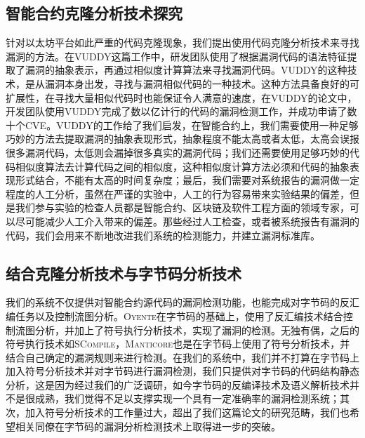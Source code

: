 \subsection{智能合约克隆分析技术探究}
针对以太坊平台如此严重的代码克隆现象，我们提出使用代码克隆分析技术来寻找漏洞的方法。在VUDDY\cite{vuddy}这篇工作中，研发团队使用了根据漏洞代码的语法特征提取了漏洞的抽象表示，再通过相似度计算算法来寻找漏洞代码。VUDDY的这种技术，是从漏洞本身出发，寻找与漏洞相似代码的一种技术。这种方法具备良好的可扩展性，在寻找大量相似代码时也能保证令人满意的速度，在VUDDY的论文中，开发团队使用VUDDY完成了数以亿计行的代码的漏洞检测工作，并成功申请了数十个CVE。VUDDY的工作给了我们启发，在智能合约上，我们需要使用一种足够巧妙的方法去提取漏洞的抽象表现形式，抽象程度不能太高或者太低，太高会误报很多漏洞代码，太低则会漏掉很多真实的漏洞代码；我们还需要使用足够巧妙的代码相似度算法去计算代码之间的相似度，这种相似度计算方法必须和代码的抽象表现形式结合，不能有太高的时间复杂度；最后，我们需要对系统报告的漏洞做一定程度的人工分析，虽然在严谨的实验中，人工的行为容易带来实验结果的偏差，但是我们参与实验的检查人员都是智能合约、区块链及软件工程方面的领域专家，可以尽可能减少人工介入带来的偏差。那些经过人工检查，或者被系统报告有漏洞的代码，我们会用来不断地改进我们系统的检测能力，并建立漏洞标准库。

\subsection{结合克隆分析技术与字节码分析技术}
我们的系统不仅提供对智能合约源代码的漏洞检测功能，也能完成对字节码的反汇编任务以及控制流图分析。\textsc{Oyente}\cite{oyente}在字节码的基础上，使用了反汇编技术结合控制流图分析，并加上了符号执行分析技术，实现了漏洞的检测。无独有偶，之后的符号执行技术如\textsc{SCompile}\cite{scompile}，\textsc{Manticore}\cite{manticore}也是在字节码上使用了符号分析技术，并结合自己确定的漏洞规则来进行检测。在我们的系统中，我们并不打算在字节码上加入符号分析技术并对字节码进行漏洞检测，我们只提供对字节码的代码结构静态分析，这是因为经过我们的广泛调研，如今字节码的反编译技术及语义解析技术并不是很成熟，我们觉得不足以支撑实现一个具有一定准确率的漏洞检测系统；其次，加入符号分析技术的工作量过大，超出了我们这篇论文的研究范畴，我们也希望相关同僚在字节码的漏洞分析检测技术上取得进一步的突破。

